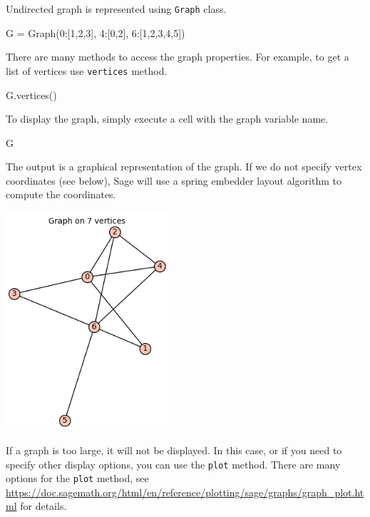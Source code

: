 Undirected graph is represented using \texttt{Graph} class.

\begin{sageCell}
    G = Graph({0:[1,2,3], 4:[0,2], 6:[1,2,3,4,5]})
\end{sageCell}
There are many methods to access the graph properties. For example, to get a list of vertices use \texttt{vertices} method.
\begin{sageCell}
    G.vertices()
\end{sageCell}
\begin{outCell}
    [0,1,2,3,4,5,6]
\end{outCell}


To display the graph, simply execute a cell with the graph variable name.
\begin{sageCell}
    G
\end{sageCell}

The output is a graphical representation of the graph. If we do not specify vertex coordinates (see below), Sage will use a spring embedder layout algorithm to compute the coordinates.
\begin{outImage}
    \includegraphics[width=6cm]{Images/Introduction/output_96_0.png}
\end{outImage}

If a graph is too large, it will not be displayed. In this case, or if you need to specify other display options, you can use the \texttt{plot} method. There are many options for the \texttt{plot} method, see \url{https://doc.sagemath.org/html/en/reference/plotting/sage/graphs/graph_plot.html} for details.

